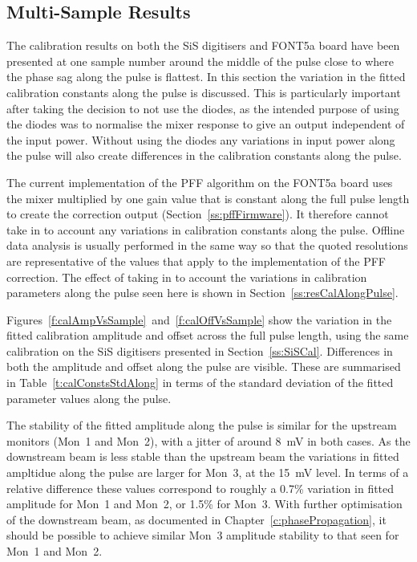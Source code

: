 \subsection{Multi-Sample Results}
\label{ss:calMultiSamp}

The calibration results on both the SiS digitisers and FONT5a board have been presented at one sample number around the middle of the pulse close to where the phase sag along the pulse is flattest. In this section the variation in the fitted calibration constants along the pulse is discussed. This is particularly important after taking the decision to not use the diodes, as the intended purpose of using the diodes was to normalise the mixer response to give an output independent of the input power. Without using the diodes any variations in input power along the pulse will also create differences in the calibration constants along the pulse. 

The current implementation of the PFF algorithm on the FONT5a board uses the mixer multiplied by one gain value that is constant along the full pulse length to create the correction output (Section~\ref{ss:pffFirmware}). It therefore cannot take in to account any variations in calibration constants along the pulse. Offline data analysis is usually performed in the same way so that the quoted resolutions are representative of the values that apply to the implementation of the PFF correction. The effect of taking in to account the variations in calibration parameters along the pulse seen here is shown in Section~\ref{ss:resCalAlongPulse}.

Figures~\ref{f:calAmpVsSample}~and~\ref{f:calOffVsSample} show the variation in the fitted calibration amplitude and offset across the full pulse length, using the same calibration on the SiS digitisers presented in Section~\ref{ss:SiSCal}. Differences in both the amplitude and offset along the pulse are visible. These are summarised in Table~\ref{t:calConstsStdAlong} in terms of the standard deviation of the fitted parameter values along the pulse. 

The stability of the fitted amplitude along the pulse is similar for the upstream monitors (Mon~1 and Mon~2), with a jitter of around 8~mV in both cases. As the downstream beam is less stable than the upstream beam the variations in fitted ampltidue along the pulse are larger for Mon~3, at the 15~mV level. In terms of a relative difference these values correspond to roughly a 0.7\% variation in fitted amplitude for Mon~1 and Mon~2, or 1.5\% for Mon~3. With further optimisation of the downstream beam, as documented in Chapter~\ref{c:phasePropagation}, it should be possible to achieve similar Mon~3 amplitude stability to that seen for Mon~1 and Mon~2. 

